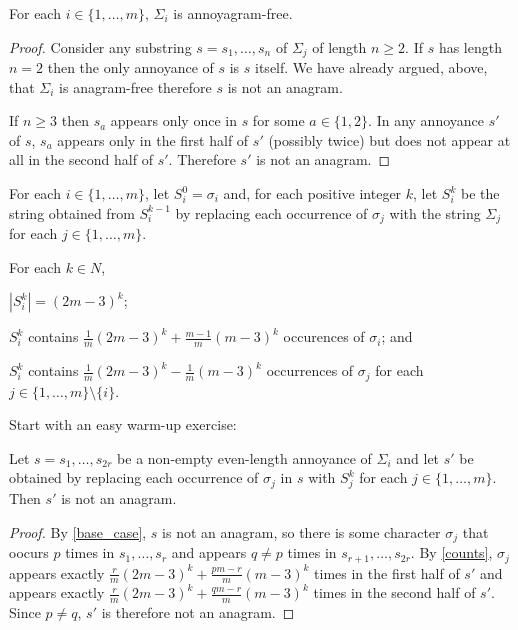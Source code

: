 \documentclass[kpfonts]{patmorin}
\begin{document}
\begin{clm}\label{base_case}
    For each $i\in\{1,\ldots,m\}$, $\Sigma_i$ is annoyagram-free.
\end{clm}

\begin{proof}
    Consider any substring $s=s_1,\ldots,s_n$ of $\Sigma_j$ of length $n\ge 2$.  If $s$ has length $n=2$ then the only annoyance of $s$ is $s$ itself. We have already argued, above, that $\Sigma_i$ is anagram-free therefore $s$ is not an anagram.

    If $n\ge 3$ then $s_a$ appears only once in $s$ for some $a\in\{1,2\}$. In any annoyance $s'$ of $s$, $s_a$ appears only in the first half of $s'$ (possibly twice) but does not appear at all in the second half of $s'$. Therefore $s'$ is not an anagram.
\end{proof}

For each $i\in\{1,\ldots,m\}$, let $S_i^0=\sigma_i$ and, for each positive integer $k$, let $S_i^k$ be the string obtained from $S_i^{k-1}$ by replacing each occurrence of $\sigma_j$ with the string $\Sigma_j$ for each $j\in\{1,\ldots,m\}$.

\begin{clm}\label{counts}
    For each $k\in N$,
    \begin{compactenum}[(i)]
        \item $|S_i^k| = (2m-3)^k$;
        \item $S_i^k$ contains $\tfrac{1}{m}(2m-3)^k + \tfrac{m-1}{m}(m-3)^k$ occurences of $\sigma_i$; and
        \item $S_i^k$ contains $\tfrac{1}{m}(2m-3)^k - \tfrac{1}{m}(m-3)^k$ occurrences of $\sigma_j$ for each $j\in\{1,\ldots,m\}\setminus\{i\}$.
    \end{compactenum}
\end{clm}

Start with an easy warm-up exercise:

\begin{clm}\label{warm_up}
    Let $s=s_1,\ldots,s_{2r}$ be a non-empty even-length annoyance of $\Sigma_i$ and let $s'$ be obtained by replacing each occurrence of $\sigma_j$ in $s$ with $S_j^k$ for each $j\in\{1,\ldots,m\}$.  Then $s'$ is not an anagram.
\end{clm}

\begin{proof}
    By \cref{base_case}, $s$ is not an anagram, so there is some character $\sigma_j$ that oocurs $p$ times in $s_1,\ldots,s_r$ and appears $q\neq p$ times in $s_{r+1},\ldots,s_{2r}$. By \cref{counts}, $\sigma_j$ appears exactly $\tfrac{r}{m}(2m-3)^k + \tfrac{pm-r}{m}(m-3)^k$ times in the first half of $s'$ and appears exactly $\tfrac{r}{m}(2m-3)^k + \tfrac{qm-r}{m}(m-3)^k$ times in the second half of $s'$.  Since $p\neq q$, $s'$ is therefore not an anagram.
\end{proof}
\end{document}
